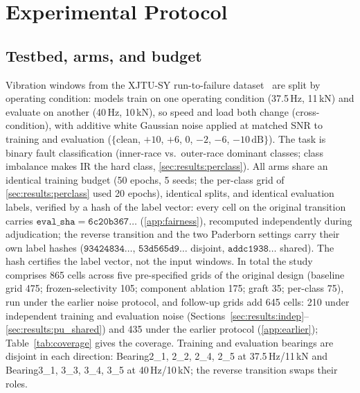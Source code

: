 \section{Experimental Protocol}
\label{sec:protocol}

\subsection{Testbed, arms, and budget}
\label{sec:protocol:testbed}

Vibration windows from the XJTU-SY run-to-failure dataset~\cite{wang2020xjtusy} are split by operating condition: models train on one operating condition (37.5\,Hz, 11\,kN) and evaluate on another (40\,Hz, 10\,kN), so speed and load both change (cross-condition), with additive white Gaussian noise applied at matched SNR to training and evaluation ($\{$clean, $+10$, $+6$, $0$, $-2$, $-6$, $-10\,\mathrm{dB}\}$). The task is binary fault classification (inner-race vs.\ outer-race dominant classes; class imbalance makes IR the hard class, \ref{sec:results:perclass}). All arms share an identical training budget (50 epochs, 5 seeds; the per-class grid of \ref{sec:results:perclass} used 20 epochs), identical splits, and identical evaluation labels, verified by a hash of the label vector: every cell on the original transition carries $\mathtt{eval\_sha} = \mathtt{6c20b367\ldots}$ (\ref{app:fairness}), recomputed independently during adjudication; the reverse transition and the two Paderborn settings carry their own label hashes ($\mathtt{93424834\ldots}$, $\mathtt{53d565d9\ldots}$ disjoint, $\mathtt{addc1938\ldots}$ shared). The hash certifies the label vector, not the input windows. In total the study comprises 865 cells across five pre-specified grids of the original design (baseline grid 475; frozen-selectivity 105; component ablation 175; graft 35; per-class 75), run under the earlier noise protocol, and follow-up grids add 645 cells: 210 under independent training and evaluation noise (Sections~\ref{sec:results:indep}--\ref{sec:results:pu_shared}) and 435 under the earlier protocol (\ref{app:earlier}); Table~\ref{tab:coverage} gives the coverage. Training and evaluation bearings are disjoint in each direction: Bearing2\_1, 2\_2, 2\_4, 2\_5 at 37.5\,Hz/11\,kN and Bearing3\_1, 3\_3, 3\_4, 3\_5 at 40\,Hz/10\,kN; the reverse transition swaps their roles.

